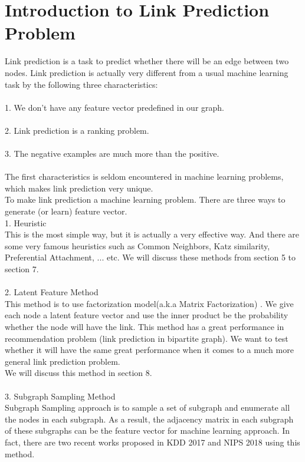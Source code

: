 \documentclass[12pt]{article}
\begin{document}
\section{Introduction to Link Prediction Problem}
Link prediction is a task to predict whether there will be an edge between two nodes. Link prediction is actually very different from a usual machine learning task by the following three characteristics:
\\ \\
1. We don't have any feature vector predefined in our graph. 
\\ \\
2. Link prediction is a ranking problem.
\\ \\
3. The negative examples are much more than the positive. 
\\  \\
The first characteristics is seldom encountered in machine learning problems, which makes link prediction very unique.  \\
To make link prediction a machine learning problem. There are three ways to generate (or learn) feature vector. \\
1. Heuristic \\ 
This is the most simple way, but it is actually a very effective way. And there are some very famous heuristics such as Common Neighbors, Katz similarity, Preferential Attachment, ... etc.  We will discuss these methods from section 5 to section 7. \\ \\
2. Latent Feature Method \\
This method is to use factorization model(a.k.a Matrix Factorization) \cite{mf}. We give each node a latent feature vector and use the inner product be the probability whether the node will have the link. This method has a great performance in recommendation problem (link prediction in bipartite graph). We want to test whether it will have the same great performance when it comes to a much more general link prediction problem. 
\\
We will discuss this method in section 8.
\\ \\
3. Subgraph Sampling Method \\ 
Subgraph Sampling approach is to sample a set of subgraph and enumerate all the nodes in each subgraph. As a result, the adjacency matrix in each subgraph of these subgraphs can be the feature vector for machine learning approach. In fact, there are two recent works proposed in KDD 2017 \cite{lp2017} and NIPS 2018 \cite{lp2018} using this method. 
\end{document}
